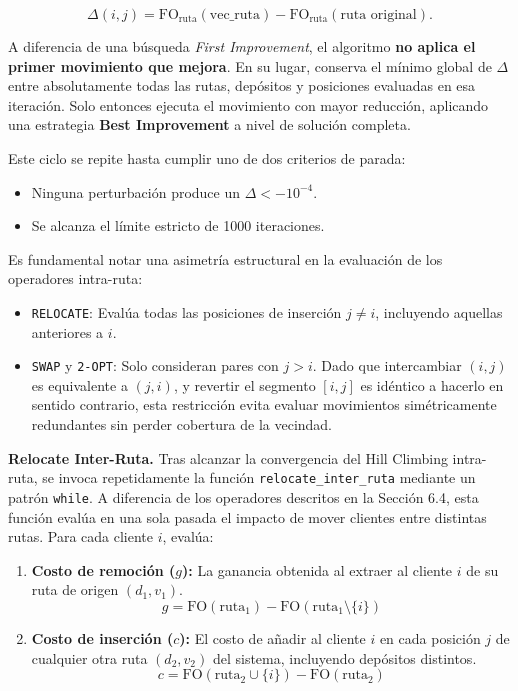 \documentclass[letter, 10pt]{article}
\begin{document}
\[
\Delta(i,j) = \text{FO}_{\text{ruta}}(\text{vec\_ruta}) - \text{FO}_{\text{ruta}}(\text{ruta original}).
\]

A diferencia de una b\'usqueda \textit{First Improvement}, el algoritmo \textbf{no aplica el primer movimiento que mejora}. En su lugar, conserva el m\'inimo global de $\Delta$ entre absolutamente todas las rutas, dep\'ositos y posiciones evaluadas en esa iteraci\'on. Solo entonces ejecuta el movimiento con mayor reducci\'on, aplicando una estrategia \textbf{Best Improvement} a nivel de soluci\'on completa.

Este ciclo se repite hasta cumplir uno de dos criterios de parada:
\begin{itemize}
    \item Ninguna perturbaci\'on produce un $\Delta < -10^{-4}$.
    \item Se alcanza el l\'imite estricto de 1000 iteraciones.
\end{itemize}

Es fundamental notar una asimetr\'ia estructural en la evaluaci\'on de los operadores intra-ruta:
\begin{itemize}
    \item \texttt{RELOCATE}: Eval\'ua todas las posiciones de inserci\'on $j \neq i$, incluyendo aquellas anteriores a $i$.
    \item \texttt{SWAP} y \texttt{2-OPT}: Solo consideran pares con $j > i$. Dado que intercambiar $(i,j)$ es equivalente a $(j,i)$, y revertir el segmento $[i,j]$ es id\'entico a hacerlo en sentido contrario, esta restricci\'on evita evaluar movimientos sim\'etricamente redundantes sin perder cobertura de la vecindad.
\end{itemize}

\textbf{Relocate Inter-Ruta.} Tras alcanzar la convergencia del Hill Climbing intra-ruta, se invoca repetidamente la funci\'on \texttt{relocate\_inter\_ruta} mediante un patr\'on \texttt{while}. A diferencia de los operadores descritos en la Secci\'on 6.4, esta funci\'on eval\'ua en una sola pasada el impacto de mover clientes entre distintas rutas. Para cada cliente $i$, eval\'ua:

\begin{enumerate}
    \item \textbf{Costo de remoci\'on ($g$):} La ganancia obtenida al extraer al cliente $i$ de su ruta de origen $(d_1, v_1)$.
    $$g = \text{FO}(\text{ruta}_1) - \text{FO}(\text{ruta}_1 \setminus \{i\})$$
    
    \item \textbf{Costo de inserci\'on ($c$):} El costo de a\~nadir al cliente $i$ en cada posici\'on $j$ de cualquier otra ruta $(d_2, v_2)$ del sistema, incluyendo dep\'ositos distintos.
    $$c = \text{FO}(\text{ruta}_2 \cup \{i\}) - \text{FO}(\text{ruta}_2)$$
\end{enumerate}
\end{document}

